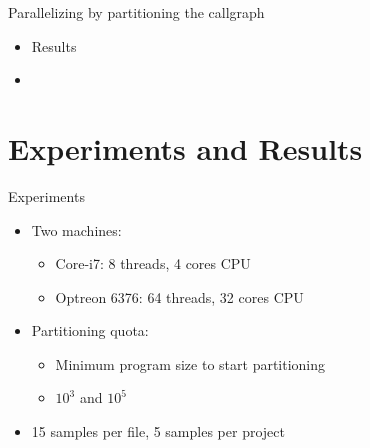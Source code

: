 \begin{frame}{Parallelizing by partitioning the callgraph}
\begin{itemize}
    \item Results
    \item[]

\begin{center}
\end{center}
\end{itemize}
\end{frame}

\section{Experiments and Results}

\begin{frame}{Experiments}

\begin{itemize}
    \item Two machines:
    \begin{itemize}
        \item Core-i7: 8 threads, 4 cores CPU
        \item Optreon 6376: 64 threads, 32 cores CPU
    \end{itemize}
    \item Partitioning quota:
    \begin{itemize}
        \item Minimum program size to start partitioning
        \item $10^3$ and $10^5$
    \end{itemize}
    \item 15 samples per file, 5 samples per project
\end{itemize}
\end{frame}

